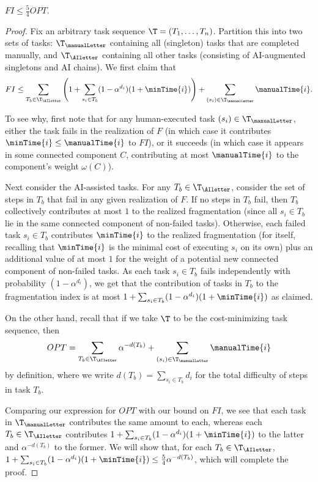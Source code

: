 \begin{lem}
\label{lem:FI.upper.bound}
    $FI \leq \tfrac{5}{4}OPT$.
\end{lem}
\begin{proof}
Fix an arbitrary task sequence $\T = (T_1, \dotsc, T_n)$.
Partition this into two sets of tasks: $\T_{\manualLetter}$ containing all (singleton) tasks that are completed manually, and $\T_{\AIletter}$ containing all other tasks (consisting of AI-augmented singletons and AI chains).
We first claim that
\[ FI \leq \sum_{T_b \in \T_{\AIletter}}\left(1 + \sum_{s_i \in T_b}(1-\alpha^{d_i})(1+\minTime{i})\right) + \sum_{(s_i) \in \T_{\manualLetter}}\manualTime{i}. \]

To see why, first note that for any human-executed task $(s_i) \in \T_{\manualLetter}$, either the task fails in the realization of $F$ (in which case it contributes $\minTime{i} \leq \manualTime{i}$ to $FI$), or it succeeds (in which case it appears in some connected component $C$, contributing at most $\manualTime{i}$ to the component's weight $\omega(C)$).

Next consider the AI-assisted tasks.
For any $T_b \in \T_{\AIletter}$, consider the set of steps in $T_b$ that fail in any given realization of $F$.
If no steps in $T_b$ fail, then $T_b$ collectively contributes at most $1$ to the realized fragmentation (since all $s_i \in T_b$ lie in the same connected component of non-failed tasks).
Otherwise, each failed task $s_i \in T_b$ contributes $\minTime{i}$ to the realized fragmentation (for itself, recalling that $\minTime{i}$ is the minimal cost of executing $s_i$ on its own) plus an additional value of at most $1$ for the weight of a potential new connected component of non-failed tasks.
As each task $s_i \in T_b$ fails independently with probability $(1-\alpha^{d_i})$, we get that the contribution of tasks in $T_b$ to the fragmentation index is at most $1 + \sum_{s_i \in T_b}(1-\alpha^{d_i})(1+\minTime{i})$ as claimed.

On the other hand, recall that if we take $\T$ to be the cost-minimizing task sequence, then
\[ OPT = \sum_{T_b \in \T_{\AIletter}} \alpha^{-d(T_b)} + \sum_{(s_i) \in \T_{\manualLetter}} \manualTime{i} \]
by definition, where we write $d(T_b) = \sum_{s_i \in T_b}d_i$ for the total difficulty of steps in task $T_b$.

Comparing our expression for $OPT$ with our bound on $FI$, we see that each task in $\T_{\manualLetter}$ contributes the same amount to each, whereas each $T_b \in \T_{\AIletter}$ contributes $1+\sum_{s_i \in T_b}(1-\alpha^{d_i})(1+\minTime{i})$ to the latter and $\alpha^{-d(T_b)}$ to the former.
We will show that, for each $T_b \in \T_{\AIletter}$, $1 + \sum_{s_i \in T_b}(1-\alpha^{d_i})(1+\minTime{i}) \leq \frac{5}{4} \alpha^{-d(T_b)}$, which will complete the proof.


\end{proof}
